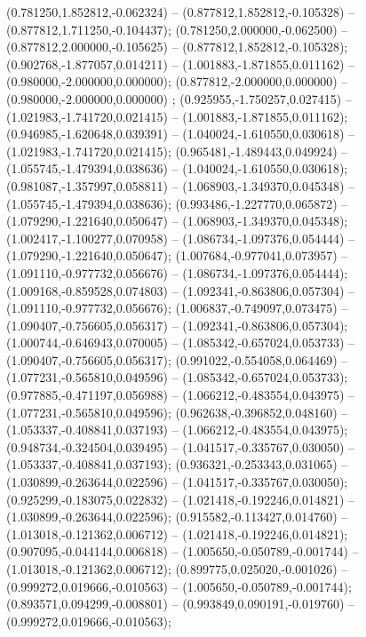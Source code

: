  (0.781250,1.852812,-0.062324) -- (0.877812,1.852812,-0.105328) -- (0.877812,1.711250,-0.104437);
 (0.781250,2.000000,-0.062500) -- (0.877812,2.000000,-0.105625) -- (0.877812,1.852812,-0.105328);
 (0.902768,-1.877057,0.014211) -- (1.001883,-1.871855,0.011162) -- (0.980000,-2.000000,0.000000);
 (0.877812,-2.000000,0.000000) -- (0.980000,-2.000000,0.000000) ;
 (0.925955,-1.750257,0.027415) -- (1.021983,-1.741720,0.021415) -- (1.001883,-1.871855,0.011162);
 (0.946985,-1.620648,0.039391) -- (1.040024,-1.610550,0.030618) -- (1.021983,-1.741720,0.021415);
 (0.965481,-1.489443,0.049924) -- (1.055745,-1.479394,0.038636) -- (1.040024,-1.610550,0.030618);
 (0.981087,-1.357997,0.058811) -- (1.068903,-1.349370,0.045348) -- (1.055745,-1.479394,0.038636);
 (0.993486,-1.227770,0.065872) -- (1.079290,-1.221640,0.050647) -- (1.068903,-1.349370,0.045348);
 (1.002417,-1.100277,0.070958) -- (1.086734,-1.097376,0.054444) -- (1.079290,-1.221640,0.050647);
 (1.007684,-0.977041,0.073957) -- (1.091110,-0.977732,0.056676) -- (1.086734,-1.097376,0.054444);
 (1.009168,-0.859528,0.074803) -- (1.092341,-0.863806,0.057304) -- (1.091110,-0.977732,0.056676);
 (1.006837,-0.749097,0.073475) -- (1.090407,-0.756605,0.056317) -- (1.092341,-0.863806,0.057304);
 (1.000744,-0.646943,0.070005) -- (1.085342,-0.657024,0.053733) -- (1.090407,-0.756605,0.056317);
 (0.991022,-0.554058,0.064469) -- (1.077231,-0.565810,0.049596) -- (1.085342,-0.657024,0.053733);
 (0.977885,-0.471197,0.056988) -- (1.066212,-0.483554,0.043975) -- (1.077231,-0.565810,0.049596);
 (0.962638,-0.396852,0.048160) -- (1.053337,-0.408841,0.037193) -- (1.066212,-0.483554,0.043975);
 (0.948734,-0.324504,0.039495) -- (1.041517,-0.335767,0.030050) -- (1.053337,-0.408841,0.037193);
 (0.936321,-0.253343,0.031065) -- (1.030899,-0.263644,0.022596) -- (1.041517,-0.335767,0.030050);
 (0.925299,-0.183075,0.022832) -- (1.021418,-0.192246,0.014821) -- (1.030899,-0.263644,0.022596);
 (0.915582,-0.113427,0.014760) -- (1.013018,-0.121362,0.006712) -- (1.021418,-0.192246,0.014821);
 (0.907095,-0.044144,0.006818) -- (1.005650,-0.050789,-0.001744) -- (1.013018,-0.121362,0.006712);
 (0.899775,0.025020,-0.001026) -- (0.999272,0.019666,-0.010563) -- (1.005650,-0.050789,-0.001744);
 (0.893571,0.094299,-0.008801) -- (0.993849,0.090191,-0.019760) -- (0.999272,0.019666,-0.010563);
